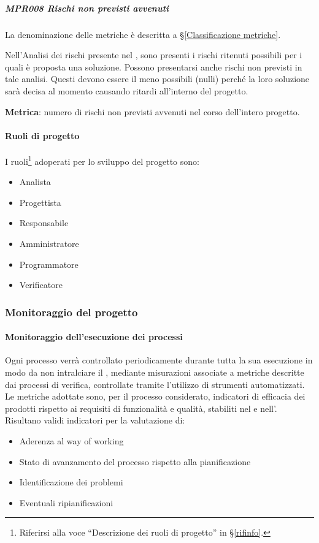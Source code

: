             \subparagraph{MPR008 Rischi non previsti avvenuti}
            La denominazione delle metriche è descritta a \S\ref{Classificazione metriche}.


            Nell'Analisi dei rischi presente nel \Doc{\PdPv}, sono presenti i rischi ritenuti possibili per i quali è proposta una soluzione.
            Possono presentarsi anche rischi non previsti in tale analisi. Questi devono essere il meno possibili (nulli) perché la loro soluzione sarà decisa al momento causando ritardi all'interno del progetto.

            \textbf{Metrica}: numero di rischi non previsti avvenuti nel corso dell'intero progetto.

			\paragraph{Ruoli di progetto}
			I ruoli\footnote{Riferirsi alla voce ``Descrizione dei ruoli di progetto'' in \S\ref{rifinfo}.} adoperati per lo sviluppo del progetto sono:
			\begin{itemize}[noitemsep]
				\item Analista
				\item Progettista
				\item Responsabile
				\item Amministratore
				\item Programmatore
				\item Verificatore
			\end{itemize}


			\subsubsection{Monitoraggio del progetto}

			\paragraph{Monitoraggio dell'esecuzione dei processi}
			Ogni processo verrà controllato periodicamente durante tutta la sua esecuzione in modo da non intralciare il ,
			mediante misurazioni associate a metriche descritte dai processi di verifica, controllate tramite l'utilizzo di strumenti automatizzati.
			Le metriche adottate sono, per il processo considerato, indicatori di efficacia dei prodotti rispetto ai requisiti di funzionalità e qualità,
			stabiliti nel \Doc{\PdQv} e nell'\Doc{\AdRv}.\\
			Risultano validi indicatori per la valutazione di:
			\begin{itemize}
				\item Aderenza al way of working
				\item Stato di avanzamento del processo rispetto alla pianificazione
				\item Identificazione dei problemi
				\item Eventuali ripianificazioni
			\end{itemize}

